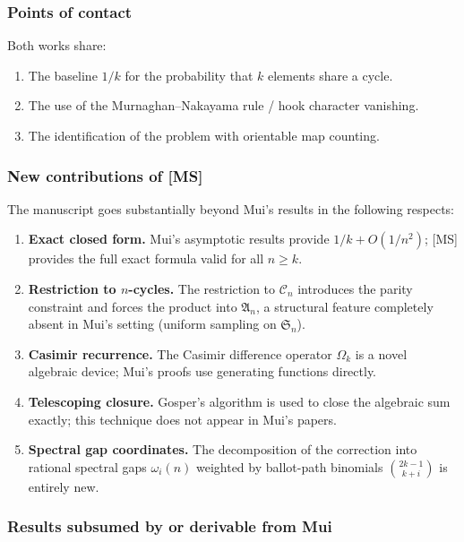\documentclass[12pt, a4paper]{amsart}
\theoremstyle{plain}
\theoremstyle{definition}
\theoremstyle{remark}
\newcommand{\C}{\mathcal{C}}
\newcommand{\Sn}{\mathfrak{S}_n}
\newcommand{\An}{\mathfrak{A}_n}
\begin{document}
\subsubsection*{Points of contact}

Both works share:
\begin{enumerate}
  \item The baseline $1/k$ for the probability that $k$ elements share a cycle.
  \item The use of the Murnaghan--Nakayama rule / hook character vanishing.
  \item The identification of the problem with orientable map counting.
\end{enumerate}

\subsubsection*{New contributions of [MS]}

The manuscript goes substantially beyond Mui's results in the following respects:
\begin{enumerate}
  \item \textbf{Exact closed form.} Mui's asymptotic results provide $1/k+O(1/n^2)$;
        [MS] provides the full exact formula valid for all $n\ge k$.
  \item \textbf{Restriction to $n$-cycles.} The restriction to $\C_n$ introduces
        the parity constraint and forces the product into $\An$, a structural feature
        completely absent in Mui's setting (uniform sampling on $\Sn$).
  \item \textbf{Casimir recurrence.} The Casimir difference operator $\Omega_k$ is
        a novel algebraic device; Mui's proofs use generating functions directly.
  \item \textbf{Telescoping closure.} Gosper's algorithm is used to close the
        algebraic sum exactly; this technique does not appear in Mui's papers.
  \item \textbf{Spectral gap coordinates.} The decomposition of the correction into
        rational spectral gaps $\omega_i(n)$ weighted by ballot-path binomials
        $\binom{2k-1}{k+i}$ is entirely new.
\end{enumerate}

\subsubsection*{Results subsumed by or derivable from Mui}
\end{document}
